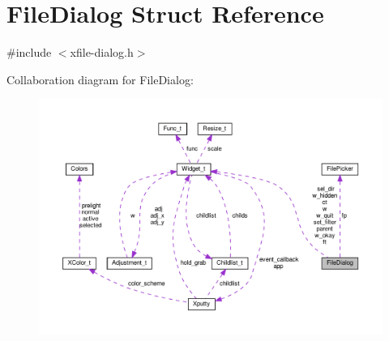 \hypertarget{structFileDialog}{}\section{File\+Dialog Struct Reference}
\label{structFileDialog}


{\ttfamily \#include $<$xfile-\/dialog.\+h$>$}



Collaboration diagram for File\+Dialog\+:
\nopagebreak
\begin{figure}[H]
\begin{center}
\leavevmode
\includegraphics[width=350pt]{structFileDialog__coll__graph}
\end{center}
\end{figure}
